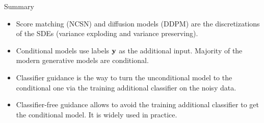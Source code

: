 \begin{frame}{Summary}
	\begin{itemize}
		\item Score matching (NCSN) and diffusion models (DDPM) are the discretizations of the SDEs (variance exploding and variance preserving).
		\vfill
		\item Conditional models use labels $\mathbf{y}$ as the additional input. Majority of the modern generative models are conditional.
		\vfill
		\item Classifier guidance is the way to turn the unconditional model to the conditional one via the training additional classifier on the noisy data.
		\vfill
		\item Classifier-free guidance allows to avoid the training additional classifier to get the conditional model. It is widely used in practice.
	\end{itemize}
\end{frame}
 